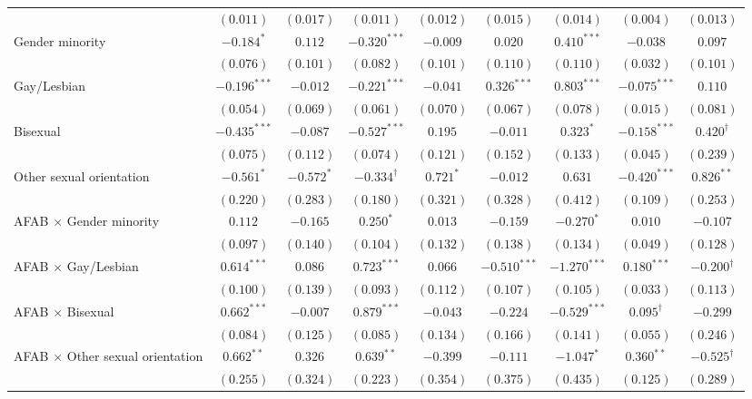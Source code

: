 \begin{table}[htpb]
{\begin{tabular}{l c c c c c c c c}
 & $(0.011)$ & $(0.017)$ & $(0.011)$ & $(0.012)$ & $(0.015)$ & $(0.014)$ & $(0.004)$ & $(0.013)$ \\
Gender minority & $-0.184^{*}$ & $0.112$ & $-0.320^{***}$ & $-0.009$ & $0.020$ & $0.410^{***}$ & $-0.038$ & $0.097$ \\
 & $(0.076)$ & $(0.101)$ & $(0.082)$ & $(0.101)$ & $(0.110)$ & $(0.110)$ & $(0.032)$ & $(0.101)$ \\
Gay/Lesbian & $-0.196^{***}$ & $-0.012$ & $-0.221^{***}$ & $-0.041$ & $0.326^{***}$ & $0.803^{***}$ & $-0.075^{***}$ & $0.110$ \\
 & $(0.054)$ & $(0.069)$ & $(0.061)$ & $(0.070)$ & $(0.067)$ & $(0.078)$ & $(0.015)$ & $(0.081)$ \\
Bisexual & $-0.435^{***}$ & $-0.087$ & $-0.527^{***}$ & $0.195$ & $-0.011$ & $0.323^{*}$ & $-0.158^{***}$ & $0.420^{\dagger}$ \\
 & $(0.075)$ & $(0.112)$ & $(0.074)$ & $(0.121)$ & $(0.152)$ & $(0.133)$ & $(0.045)$ & $(0.239)$ \\
Other sexual orientation & $-0.561^{*}$ & $-0.572^{*}$ & $-0.334^{\dagger}$ & $0.721^{*}$ & $-0.012$ & $0.631$ & $-0.420^{***}$ & $0.826^{**}$ \\
 & $(0.220)$ & $(0.283)$ & $(0.180)$ & $(0.321)$ & $(0.328)$ & $(0.412)$ & $(0.109)$ & $(0.253)$ \\
AFAB $\times$ Gender minority & $0.112$ & $-0.165$ & $0.250^{*}$ & $0.013$ & $-0.159$ & $-0.270^{*}$ & $0.010$ & $-0.107$ \\
 & $(0.097)$ & $(0.140)$ & $(0.104)$ & $(0.132)$ & $(0.138)$ & $(0.134)$ & $(0.049)$ & $(0.128)$ \\
AFAB $\times$ Gay/Lesbian & $0.614^{***}$ & $0.086$ & $0.723^{***}$ & $0.066$ & $-0.510^{***}$ & $-1.270^{***}$ & $0.180^{***}$ & $-0.200^{\dagger}$ \\
 & $(0.100)$ & $(0.139)$ & $(0.093)$ & $(0.112)$ & $(0.107)$ & $(0.105)$ & $(0.033)$ & $(0.113)$ \\
AFAB $\times$ Bisexual & $0.662^{***}$ & $-0.007$ & $0.879^{***}$ & $-0.043$ & $-0.224$ & $-0.529^{***}$ & $0.095^{\dagger}$ & $-0.299$ \\
 & $(0.084)$ & $(0.125)$ & $(0.085)$ & $(0.134)$ & $(0.166)$ & $(0.141)$ & $(0.055)$ & $(0.246)$ \\
AFAB $\times$ Other sexual orientation & $0.662^{**}$ & $0.326$ & $0.639^{**}$ & $-0.399$ & $-0.111$ & $-1.047^{*}$ & $0.360^{**}$ & $-0.525^{\dagger}$ \\
 & $(0.255)$ & $(0.324)$ & $(0.223)$ & $(0.354)$ & $(0.375)$ & $(0.435)$ & $(0.125)$ & $(0.289)$ \\

\end{tabular}}
\end{table}

